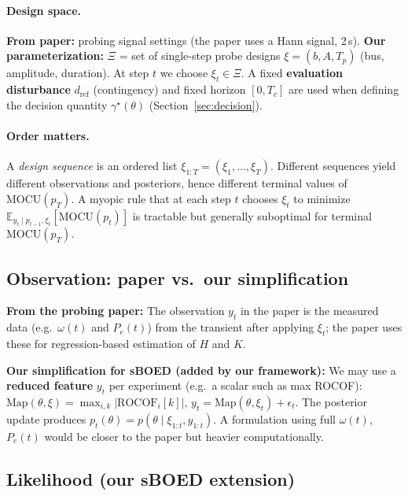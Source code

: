 \documentclass[10pt]{article}
\newcommand{\Map}{\mathrm{Map}}
\newcommand{\MOCU}{\mathrm{MOCU}}
\begin{document}
\paragraph{Design space.}
\textbf{From paper:} probing signal settings (the paper uses a Hann signal, 2\,s). \textbf{Our parameterization:} $\Xi$ = set of single-step probe designs $\xi=(b,A,T_p)$ (bus, amplitude, duration). At step $t$ we choose $\xi_t\in\Xi$. A fixed \textbf{evaluation disturbance} $d_{\mathrm{ref}}$ (contingency) and fixed horizon $[0,T_c]$ are used when defining the decision quantity $\gamma^\star(\theta)$ (Section~\ref{sec:decision}).

\paragraph{Order matters.}
A \emph{design sequence} is an ordered list $\xi_{1:T}=(\xi_1,\dots,\xi_T)$. Different sequences yield different observations and posteriors, hence different terminal values of $\MOCU(p_T)$. A myopic rule that at each step $t$ chooses $\xi_t$ to minimize $\mathbb{E}_{y_t\mid p_{t-1},\xi_t}[\MOCU(p_t)]$ is tractable but generally suboptimal for terminal $\MOCU(p_T)$.

\subsection{Observation: paper vs.\ our simplification}
\label{sec:observation}

\textbf{From the probing paper:} The observation $y_t$ in the paper is the measured data (e.g.\ $\omega(t)$ and $P_e(t)$) from the transient after applying $\xi_t$; the paper uses these for regression-based estimation of $H$ and $K$.

\textbf{Our simplification for sBOED (added by our framework):} We may use a \textbf{reduced feature} $y_t$ per experiment (e.g.\ a scalar such as max ROCOF): $\Map(\theta,\xi)=\max_{i,k}|\mathrm{ROCOF}_i[k]|$, $y_t=\Map(\theta,\xi_t)+\epsilon_t$. The posterior update produces $p_t(\theta)=p(\theta\mid\xi_{1:t},y_{1:t})$. A formulation using full $\omega(t)$, $P_e(t)$ would be closer to the paper but heavier computationally.

\subsection{Likelihood (our sBOED extension)}
\label{sec:likelihood}
\end{document}
